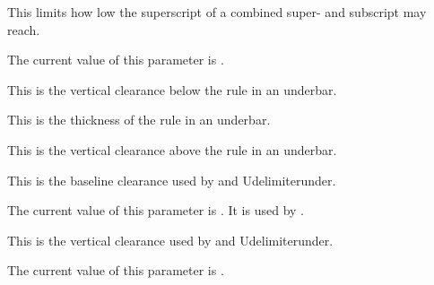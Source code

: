 \stopnewprimitive

\startnewprimitive[title={\prm {Umathsupsubbottommax}}]

This limits how low the superscript of a combined super- and subscript may reach.

\stopnewprimitive

\startnewprimitive[title={\prm {Umathtopaccentvariant}}]

The current value of this parameter is \CurrentMathVariant
\Umathtopaccentvariant.

\stopnewprimitive

\startnewprimitive[title={\prm {Umathunderbarkern}}]

This is the vertical clearance below the rule in an underbar.

\stopnewprimitive

\startnewprimitive[title={\prm {Umathunderbarrule}}]

This is the thickness of the rule in an underbar.

\stopnewprimitive

\startnewprimitive[title={\prm {Umathunderbarvgap}}]

This is the vertical clearance above the rule in an underbar.

\stopnewprimitive

\startnewprimitive[title={\prm {Umathunderdelimiterbgap}}]

This is the baseline clearance used by  and \prm
{Udelimiterunder}.

\stopnewprimitive

\startnewprimitive[title={\prm {Umathunderdelimitervariant}}]

The current value of this parameter is \CurrentMathVariant
\Umathunderdelimitervariant. It is used by .

\stopnewprimitive

\startnewprimitive[title={\prm {Umathunderdelimitervgap}}]

This is the vertical clearance used by  and \prm
{Udelimiterunder}.

\stopnewprimitive

\startnewprimitive[title={\prm {Umathunderlinevariant}}]

The current value of this parameter is \CurrentMathVariant
\Umathunderlinevariant.

\stopnewprimitive

\startnewprimitive[title={\prm {Umathuseaxis}}]

